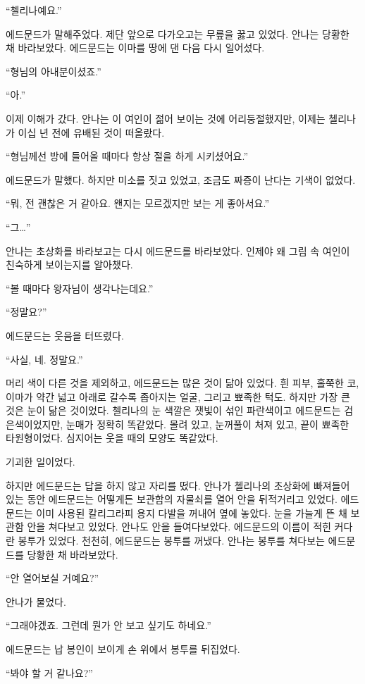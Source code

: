 ``첼리나예요.''

에드문드가 말해주었다. 제단 앞으로 다가오고는 무릎을 꿇고 있었다. 안나는 당황한 채 바라보았다. 에드문드는 이마를 땅에 댄 다음 다시 일어섰다.

``형님의 아내분이셨죠.''

``아.''

이제 이해가 갔다. 안나는 이 여인이 젊어 보이는 것에 어리둥절했지만, 이제는 첼리나가 이십 년 전에 유배된 것이 떠올랐다.

``형님께선 방에 들어올 때마다 항상 절을 하게 시키셨어요.''

에드문드가 말했다. 하지만 미소를 짓고 있었고, 조금도 짜증이 난다는 기색이 없었다.

``뭐, 전 괜찮은 거 같아요. 왠지는 모르겠지만 보는 게 좋아서요.''

``그\ldots''

안나는 초상화를 바라보고는 다시 에드문드를 바라보았다. 인제야 왜 그림 속 여인이 친숙하게 보이는지를 알아챘다.

``볼 때마다 왕자님이 생각나는데요.''

``정말요?''

에드문드는 웃음을 터뜨렸다.

``사실, 네. 정말요.''

머리 색이 다른 것을 제외하고, 에드문드는 많은 것이 닮아 있었다. 흰 피부, 홀쭉한 코, 이마가 약간 넓고 아래로 갈수록 좁아지는 얼굴, 그리고 뾰족한 턱도. 하지만 가장 큰 것은 눈이 닮은 것이었다. 첼리나의 눈 색깔은 잿빛이 섞인 파란색이고 에드문드는 검은색이었지만, 눈매가 정확히 똑같았다. 몰려 있고, 눈꺼풀이 처져 있고, 끝이 뾰족한 타원형이었다. 심지어는 웃을 때의 모양도 똑같았다.

기괴한 일이었다.

하지만 에드문드는 답을 하지 않고 자리를 떴다. 안나가 첼리나의 초상화에 빠져들어 있는 동안 에드문드는 어떻게든 보관함의 자물쇠를 열어 안을 뒤적거리고 있었다. 에드문드는 이미 사용된 칼리그라피 용지 다발을 꺼내어 옆에 놓았다. 눈을 가늘게 뜬 채 보관함 안을 쳐다보고 있었다. 안나도 안을 들여다보았다. 에드문드의 이름이 적힌 커다란 봉투가 있었다. 천천히, 에드문드는 봉투를 꺼냈다. 안나는 봉투를 쳐다보는 에드문드를 당황한 채 바라보았다.

``안 열어보실 거예요?''

안나가 물었다.

``그래야겠죠. 그런데 뭔가 안 보고 싶기도 하네요.''

에드문드는 납 봉인이 보이게 손 위에서 봉투를 뒤집었다.

``봐야 할 거 같나요?''

